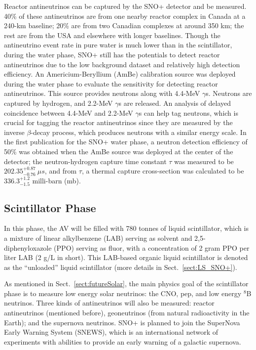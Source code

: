 Reactor antineutrinos can be captured by the SNO+ detector and be measured. 40\% of these antineutrinos are from one nearby reactor complex in Canada at a 240-km baseline; 20\% are from two Canadian complexes at around 350 km; the rest are from the USA and elsewhere with longer baselines\cite{whitepaper}. Though the antineutrino event rate in pure water is much lower than in the scintillator, during the water phase, SNO+ still has the potentials to detect reactor antineutrinos due to the low background dataset and relatively high detection efficiency. An Americium-Beryllium (AmBe) calibration source was deployed during the water phase to evaluate the sensitivity for detecting reactor antineutrinos.  This source provides neutrons along with 4.4-MeV $\gamma$s. Neutrons are captured by hydrogen, and 2.2-MeV $\gamma$s are released. An analysis of delayed coincidence between 4.4-MeV and 2.2-MeV $\gamma$s can help tag neutrons, which is crucial for tagging the reactor antineutrinos since they are measured by the inverse $\beta$-decay process, which produces neutrons with a similar energy scale. In the first publication for the SNO+ water phase, a neutron detection efficiency of 50\% was obtained when the AmBe source was deployed at the center of the detector; the neutron-hydrogen capture time constant $\tau$ was measured to be $202.35_{-0.76}^{+0.87}~\mu s$, and from $\tau$, a thermal capture cross-section was calculated to be $336.3^{+1.2}_{-1.5}$ milli-barn (mb)\cite{anderson2020measurement}.

\subsection{Scintillator Phase} \label{sect:scintPhase}
In this phase, the AV will be filled with 780 tonnes of liquid scintillator, which is a mixture of linear alkylbenzene (LAB) serving as solvent and 2,5-diphenyloxazole (PPO) serving as fluor, with a concentration of 2 gram PPO per liter LAB (2 g/L in short). This LAB-based organic liquid scintillator is denoted as the ``unloaded'' liquid scintillator (more details in Sect.~\ref{sect:LS_SNO+}).

As mentioned in Sect.~\ref{sect:futureSolar}, the main physics goal of the scintillator phase is to measure low energy solar neutrinos: the CNO, pep, and low energy $^8$B neutrinos. Three kinds of antineutrinos will also be measured: reactor antineutrinos (mentioned before), geoneutrinos (from natural radioactivity in the Earth); and the supernova neutrinos. SNO+ is planned to join the SuperNova Early Warning System (SNEWS), which is an international network of experiments with abilities to provide an early warning of a galactic supernova\cite{snop_jinst}.

